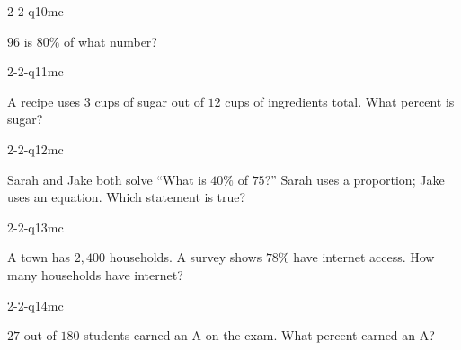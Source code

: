 \begin{practiceQuestion}{2-2-q10}{mc}
\begin{questionText}
$96$ is $80\%$ of what number?
\end{questionText}
\end{practiceQuestion}

\begin{practiceQuestion}{2-2-q11}{mc}
\begin{questionText}
A recipe uses $3$ cups of sugar out of $12$ cups of ingredients total. What percent is sugar?
\end{questionText}
\end{practiceQuestion}

\begin{practiceQuestion}{2-2-q12}{mc}
\begin{questionText}
Sarah and Jake both solve ``What is $40\%$ of $75$?'' Sarah uses a proportion; Jake uses an equation. Which statement is true?
\end{questionText}
\end{practiceQuestion}

\begin{practiceQuestion}{2-2-q13}{mc}
\begin{questionText}
A town has $2{,}400$ households. A survey shows $78\%$ have internet access. How many households have internet?
\end{questionText}
\end{practiceQuestion}

\begin{practiceQuestion}{2-2-q14}{mc}
\begin{questionText}
$27$ out of $180$ students earned an A on the exam. What percent earned an A?
\end{questionText}
\end{practiceQuestion}

